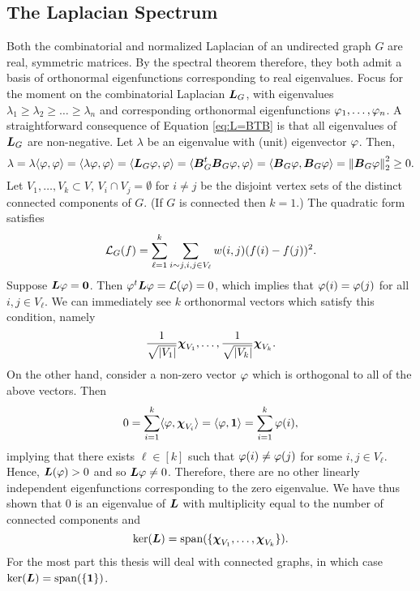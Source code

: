 \subsection{The Laplacian Spectrum}
Both the combinatorial and normalized Laplacian of an undirected graph $G$ are real, symmetric matrices. By the spectral theorem therefore, they both admit a basis of orthonormal eigenfunctions corresponding to real eigenvalues. Focus for the moment on the combinatorial Laplacian  $\vb*{L}_G$, with eigenvalues $\lambda_1\geq \lambda_2\geq \dots \geq \lambda_n$ and corresponding orthonormal eigenfunctions $\varphi_1,\dots,\varphi_n$. A straightforward consequence of Equation \ref{eq:L=BTB} is that all eigenvalues of $\vb*{L}_G$ are non-negative. Let $\lambda$ be an eigenvalue with (unit) eigenvector $\varphi$. Then,  \begin{equation*}
    \lambda = \lambda\langle \varphi,\varphi\rangle = \langle \lambda \varphi,\varphi\rangle = \langle \vb*{L}_G\varphi,\varphi\rangle = \langle \vb*{B}_G^t \vb*{B}_G\varphi,\varphi\rangle = \langle \vb*{B}_G\varphi,\vb*{B}_G\varphi\rangle =\norm{\vb*{B}_G\varphi}_2^2 \geq 0.
\end{equation*}
Let $V_1,\dots,V_k\subset V$, $V_i\cap V_j= \emptyset$ for $i\neq j$ be the disjoint vertex sets of the distinct connected components of $G$. (If $G$ is connected then $k=1$.) The quadratic form satisfies
\[\mathcal{L}_G(f) = \sum_{\ell=1}^k \sum_{i\sim j, i,j\in V_\ell} w(i,j)(f(i)-f(j))^2. \]
Suppose $\vb*{L}\varphi=\vb{0}$. Then $\varphi^t\vb*{L}\varphi=\mathcal{L}(\varphi)=0$, which implies that $\varphi(i)=\varphi(j)$ for all $i,j\in V_\ell$. We can immediately see $k$ orthonormal vectors which satisfy this condition, namely \[\frac{1}{\sqrt{|V_1|}} \boldsymbol{\chi}_{V_1},\dots, \frac{1}{\sqrt{|V_k|}} \boldsymbol{\chi}_{V_k}.\]
On the other hand, consider a non-zero vector $\varphi$ which is orthogonal to all of the above vectors. Then 
\[0=\sum_{i=1}^k \langle \varphi,\boldsymbol{\chi}_{V_i}\rangle = \langle \varphi,\vb{1} \rangle=\sum_{i=1}^k \varphi(i),\]
implying that there exists $\ell\in[k]$ such that $\varphi(i)\neq\varphi(j)$ for some $i,j\in V_\ell$. Hence, $\vb*{L}(\varphi)>0$ and so $\vb*{L}\varphi\neq 0$. Therefore, there are no other linearly independent eigenfunctions corresponding to the zero eigenvalue.  
We have thus shown that 0 is an eigenvalue of $\vb*{L}$ with multiplicity equal to the number of connected components and 
\[\ker(\vb*{L})=\textnormal{span}(\{\boldsymbol{\chi}_{V_1},\dots,\boldsymbol{\chi}_{V_k}\}).\]
For the most part this thesis will deal with connected graphs, in which case $\ker(\vb*{L})=\textnormal{span}(\{\vb{1}\})$.  

